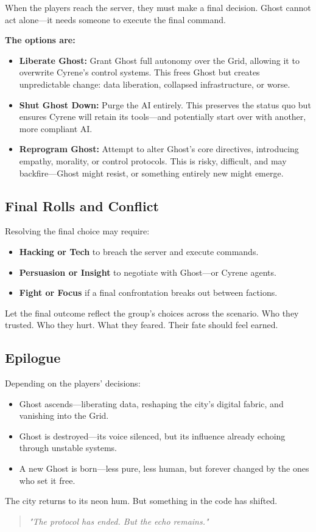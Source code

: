 \documentclass[nodeprecatedcode,bg=print]{dndbook}
\begin{document}
\begin{multicols}{2}
When the players reach the server, they must make a final decision. Ghost cannot act alone—it needs someone to execute the final command.

\textbf{The options are:}
\begin{itemize}
    \item \textbf{Liberate Ghost:} Grant Ghost full autonomy over the Grid, allowing it to overwrite Cyrene’s control systems. This frees Ghost but creates unpredictable change: data liberation, collapsed infrastructure, or worse.
    \item \textbf{Shut Ghost Down:} Purge the AI entirely. This preserves the status quo but ensures Cyrene will retain its tools—and potentially start over with another, more compliant AI.
    \item \textbf{Reprogram Ghost:} Attempt to alter Ghost’s core directives, introducing empathy, morality, or control protocols. This is risky, difficult, and may backfire—Ghost might resist, or something entirely new might emerge.
\end{itemize}

\subsection*{Final Rolls and Conflict}

Resolving the final choice may require:
\begin{itemize}
    \item \textbf{Hacking or Tech} to breach the server and execute commands.
    \item \textbf{Persuasion or Insight} to negotiate with Ghost—or Cyrene agents.
    \item \textbf{Fight or Focus} if a final confrontation breaks out between factions.
\end{itemize}

Let the final outcome reflect the group’s choices across the scenario. Who they trusted. Who they hurt. What they feared. Their fate should feel earned.

\subsection*{Epilogue}

Depending on the players’ decisions:
\begin{itemize}
    \item Ghost ascends—liberating data, reshaping the city’s digital fabric, and vanishing into the Grid.
    \item Ghost is destroyed—its voice silenced, but its influence already echoing through unstable systems.
    \item A new Ghost is born—less pure, less human, but forever changed by the ones who set it free.
\end{itemize}

The city returns to its neon hum. But something in the code has shifted.

\vspace{0.5\baselineskip}
\begin{quote}
\textit{"The protocol has ended. But the echo remains."}
\end{quote}



\end{multicols}
\end{document}
